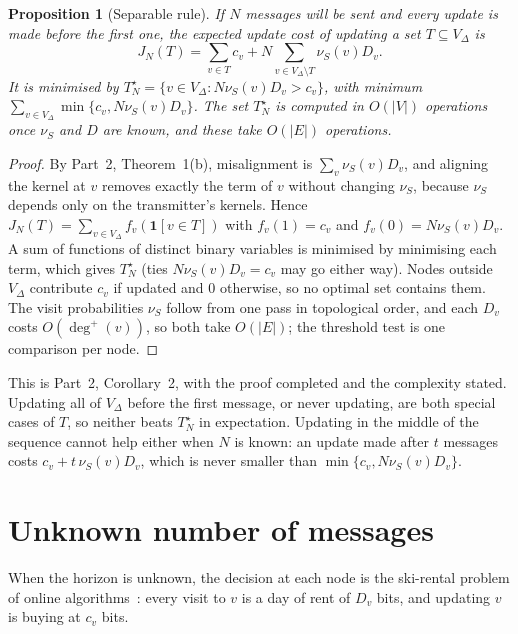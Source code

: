\documentclass[11pt]{article}
\newtheorem{proposition}[theorem]{Proposition}
\theoremstyle{definition}
\theoremstyle{remark}
\begin{document}
\begin{proposition}[Separable rule]\label{prop:c1}
If $N$ messages will be sent and every update is made before the first one, the expected update cost of updating a set $T\subseteq V_\Delta$ is
\[
J_N(T)=\sum_{v\in T}c_v+N\sum_{v\in V_\Delta\setminus T}\nu_S(v)D_v .
\]
It is minimised by $T^\star_N=\{v\in V_\Delta:N\nu_S(v)D_v>c_v\}$, with minimum $\sum_{v\in V_\Delta}\min\{c_v,N\nu_S(v)D_v\}$. The set $T^\star_N$ is computed in $O(|V|)$ operations once $\nu_S$ and $D$ are known, and these take $O(|E|)$ operations.
\end{proposition}

\begin{proof}
By Part~2, Theorem~1(b), misalignment is $\sum_v\nu_S(v)D_v$, and aligning the kernel at $v$ removes exactly the term of $v$ without changing $\nu_S$, because $\nu_S$ depends only on the transmitter's kernels. Hence $J_N(T)=\sum_{v\in V_\Delta}f_v(\mathbf 1[v\in T])$ with $f_v(1)=c_v$ and $f_v(0)=N\nu_S(v)D_v$. A sum of functions of distinct binary variables is minimised by minimising each term, which gives $T^\star_N$ (ties $N\nu_S(v)D_v=c_v$ may go either way). Nodes outside $V_\Delta$ contribute $c_v$ if updated and $0$ otherwise, so no optimal set contains them. The visit probabilities $\nu_S$ follow from one pass in topological order, and each $D_v$ costs $O(\deg^+(v))$, so both take $O(|E|)$; the threshold test is one comparison per node.
\end{proof}

This is Part~2, Corollary~2, with the proof completed and the complexity stated. Updating all of $V_\Delta$ before the first message, or never updating, are both special cases of $T$, so neither beats $T^\star_N$ in expectation. Updating in the middle of the sequence cannot help either when $N$ is known: an update made after $t$ messages costs $c_v+t\,\nu_S(v)D_v$, which is never smaller than $\min\{c_v,N\nu_S(v)D_v\}$.

\section{Unknown number of messages}

When the horizon is unknown, the decision at each node is the ski-rental problem of online algorithms~\cite{karlin1988}: every visit to $v$ is a day of rent of $D_v$ bits, and updating $v$ is buying at $c_v$ bits.
\end{document}
